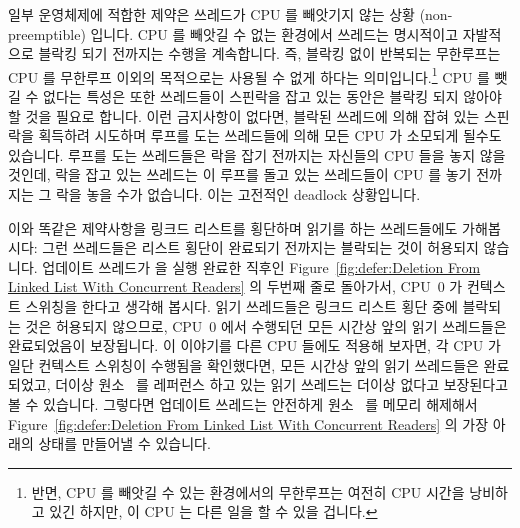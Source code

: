 일부 운영체제에 적합한 제약은 쓰레드가 CPU 를
빼앗기지 않는 상황 (non-preemptible) 입니다.
CPU 를 빼앗길 수 없는 환경에서 쓰레드는 명시적이고 자발적으로
블락킹 되기 전까지는 수행을 계속합니다.
즉, 블락킹 없이 반복되는 무한루프는 CPU 를
무한루프 이외의 목적으로는 사용될 수 없게 하다는 의미입니다.\footnote{
	반면, CPU 를 빼앗길 수 있는 환경에서의 무한루프는 여전히 CPU 시간을
	낭비하고 있긴 하지만, 이 CPU 는 다른 일을 할 수 있을 겁니다.}
CPU 를 뺏길 수 없다는 특성은 또한 쓰레드들이 스핀락을 잡고 있는 동안은 블락킹
되지 않아야 할 것을 필요로 합니다.
이런 금지사항이 없다면, 블락된 쓰레드에 의해 잡혀 있는 스핀락을 획득하려
시도하며 루프를 도는 쓰레드들에 의해 모든 CPU 가 소모되게 될수도 있습니다.
루프를 도는 쓰레드들은 락을 잡기 전까지는 자신들의 CPU 들을 놓지 않을 것인데,
락을 잡고 있는 쓰레드는 이 루프를 돌고 있는 쓰레드들이 CPU 를 놓기 전까지는 그
락을 놓을 수가 없습니다.
이는 고전적인 deadlock 상황입니다.

이와 똑같은 제약사항을 링크드 리스트를 횡단하며 읽기를 하는 쓰레드들에도
가해봅시다: 그런 쓰레드들은 리스트 횡단이 완료되기 전까지는 블락되는 것이
허용되지 않습니다.
업데이트 쓰레드가  을 실행 완료한 직후인
Figure~\ref{fig:defer:Deletion From Linked List With Concurrent Readers} 의
두번째 줄로 돌아가서, CPU~0 가 컨텍스트 스위칭을 한다고 생각해 봅시다.
읽기 쓰레드들은 링크드 리스트 횡단 중에 블락되는 것은 허용되지 않으므로, CPU~0
에서 수행되던 모든 시간상 앞의 읽기 쓰레드들은 완료되었음이 보장됩니다.
이 이야기를 다른 CPU 들에도 적용해 보자면, 각 CPU 가 일단 컨텍스트 스위칭이
수행됨을 확인했다면, 모든 시간상 앞의 읽기 쓰레드들은 완료되었고, 더이상
원소~ 를 레퍼런스 하고 있는 읽기 쓰레드는 더이상 없다고 보장된다고 볼 수
있습니다.
그렇다면 업데이트 쓰레드는 안전하게 원소~ 를 메모리 해제해서
Figure~\ref{fig:defer:Deletion From Linked List With Concurrent Readers} 의
가장 아래의 상태를 만들어낼 수 있습니다.
\iffalse


